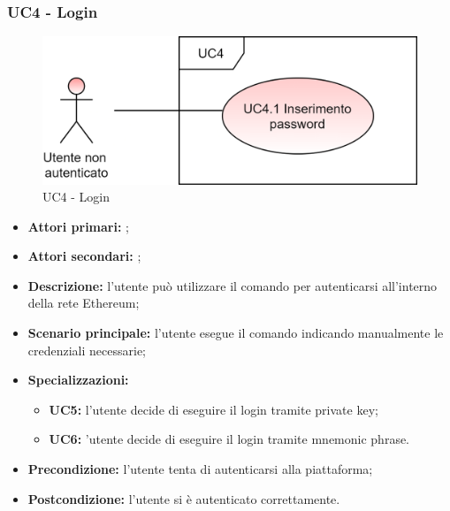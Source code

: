 \subsubsection{UC4 - Login}
\begin{figure}[h]
	\centering
	\includegraphics[scale=\ucs]{./res/img/UC4.png}
	\caption {UC4 - Login}
\end{figure}
\begin{itemize}
	\item \textbf{Attori primari:} \una{};
	\item \textbf{Attori secondari:} \re{};
	\item \textbf{Descrizione:} l’utente può utilizzare il comando \login{} per autenticarsi all’interno della rete Ethereum; 
	\item \textbf{Scenario principale:} l'utente esegue il comando \login{} indicando manualmente le credenziali necessarie; 
	\item \textbf{Specializzazioni:} 
	\begin{itemize}
		\item \textbf{UC5:} l’utente decide di eseguire il login tramite private key;
		\item \textbf{UC6:} ’utente decide di eseguire il login tramite mnemonic phrase.
	\end{itemize}
	\item \textbf{Precondizione:} l’utente tenta di autenticarsi alla piattaforma;
	\item \textbf{Postcondizione:} l’utente si è autenticato correttamente.
\end{itemize}